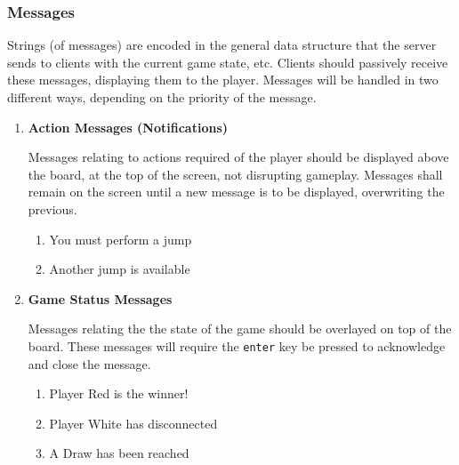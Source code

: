 \documentclass[letterpaper]{article}
\begin{document}
\subsubsection{Messages}
\label{sec:ui_game_messages}

          Strings (of messages) are encoded in the general data
          structure that the server sends to clients with the
          current game state, etc. Clients should passively
          receive these messages, displaying them to the player.
          Messages will be handled in two different ways,
          depending on the priority of the message.

\begin{enumerate}
    \item \textbf{Action Messages (Notifications)}
          
          Messages relating to actions required of the player
          should be displayed above the board, at the top of
          the screen, not disrupting gameplay. Messages shall
          remain on the screen until a new message is to be
          displayed, overwriting the previous.
          
          \begin{enumerate}
              \item You must perform a jump
              \item Another jump is available
          \end{enumerate}
          
    \item \textbf{Game Status Messages}
    
          Messages relating the the state of the game should
          be overlayed on top of the board. These messages
          will require the \texttt{enter} key be pressed to
          acknowledge and close the message.
          
          \begin{enumerate}
              \item Player Red is the winner!
              \item Player White has disconnected
              \item A Draw has been reached
          \end{enumerate}
          
\end{enumerate}

\end{document}
